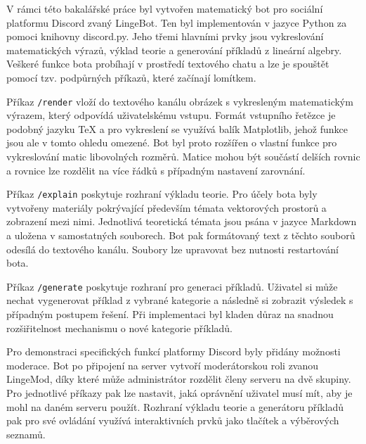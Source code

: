 \documentclass[FM]{tulthesis}
\begin{document}
	
	
	V rámci této bakalářské práce byl vytvořen matematický bot pro sociální platformu Discord zvaný LingeBot. Ten byl implementován v jazyce Python za pomoci knihovny discord.py. Jeho třemi hlavními prvky jsou vykreslování matematických výrazů, výklad teorie a generování příkladů z lineární algebry. Veškeré funkce bota probíhají v prostředí textového chatu a lze je spouštět pomocí tzv. podpůrných příkazů, které začínají lomítkem.
	
	Příkaz \verb|/render| vloží do textového kanálu obrázek s vykresleným matematickým výrazem, který odpovídá uživatelskému vstupu. Formát vstupního řetězce je podobný jazyku TeX a pro vykreslení se využívá balík Matplotlib, jehož funkce jsou ale v tomto ohledu omezené. Bot byl proto rozšířen o vlastní funkce pro vykreslování matic libovolných rozměrů. Matice mohou být součástí delších rovnic a rovnice lze rozdělit na více řádků s případným nastavení zarovnání.
	
	Příkaz \verb|/explain| poskytuje rozhraní výkladu teorie. Pro účely bota byly vytvořeny materiály pokrývající především témata vektorových prostorů a zobrazení mezi nimi. Jednotlivá teoretická témata jsou psána v jazyce Markdown a uložena v samostatných souborech. Bot pak formátovaný text z těchto souborů odesílá do textového kanálu. Soubory lze upravovat bez nutnosti restartování bota. %
	
	Příkaz \verb|/generate| poskytuje rozhraní pro generaci příkladů. Uživatel si může nechat vygenerovat příklad z vybrané kategorie a následně si zobrazit výsledek s případným postupem řešení. Při implementaci byl kladen důraz na snadnou rozšiřitelnost mechanismu o nové kategorie příkladů.
	
	Pro demonstraci specifických funkcí platformy Discord byly přidány možnosti moderace. Bot po připojení na server vytvoří moderátorskou roli zvanou LingeMod, díky které může administrátor rozdělit členy serveru na dvě skupiny. Pro jednotlivé příkazy pak lze nastavit, jaká oprávnění uživatel musí mít, aby je mohl na daném serveru použít. Rozhraní výkladu teorie a generátoru příkladů pak pro své ovládání využívá interaktivních prvků jako tlačítek a výběrových seznamů.
	
\end{document}
